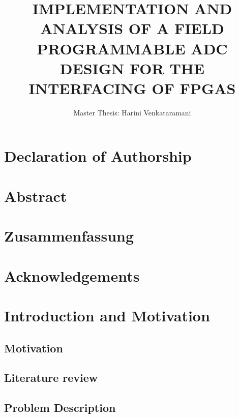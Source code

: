 \documentclass[linedtoc,
               parskip,
               twoside,
               longdoc,
               11pt,
               noheadingspace,
               accentcolor=tud1d,
               bigchapter,
               colorback]{tudreport}
\title{IMPLEMENTATION AND ANALYSIS OF A FIELD
PROGRAMMABLE ADC DESIGN FOR THE INTERFACING OF
FPGAS}
\subtitle{Master Thesis: Harini Venkataramani}
\begin{document}
\maketitle
\cleardoublepage

\pagestyle{empty}

\pagestyle{plain}
\tableofcontents
\cleardoublepage


\pagestyle{headings}
%
%
%
%
%
%
%
%
%
%
%



\chapter*{Declaration of Authorship}
\chapter*{Abstract}
\chapter*{Zusammenfassung}
\chapter*{Acknowledgements}

\chapter{Introduction and Motivation}
\section{Motivation}
\section{Literature review}
\section{Problem Description}
\end{document}
